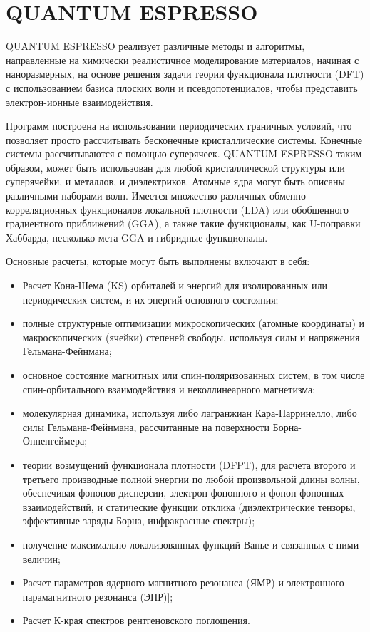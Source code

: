 \section{QUANTUM ESPRESSO}
QUANTUM ESPRESSO реализует различные методы и алгоритмы, направленные на химически реалистичное моделирование материалов, начиная с наноразмерных, на основе решения задачи теории функционала плотности (DFT) с использованием базиса плоских волн и псевдопотенциалов, чтобы представить электрон-ионные взаимодействия.

Программ построена на использовании периодических граничных условий, что позволяет просто рассчитывать бесконечные кристаллические системы. Конечные системы рассчитываются с помощью суперячеек. QUANTUM ESPRESSO таким образом, может быть использован для любой кристаллической структуры или суперячейки, и металлов, и диэлектриков. Атомные ядра могут быть описаны различными наборами волн. Имеется множество различных обменно-корреляционных функционалов локальной плотности (LDA) или обобщенного градиентного приближений (GGA), а также такие функционалы, как U-поправки Хаббарда, несколько мета-GGA и гибридные функционалы.

Основные расчеты, которые могут быть выполнены включают в себя:
\begin{itemize}
    \item Расчет Кона-Шема (KS) орбиталей и энергий для изолированных или периодических систем, и их энергий основного состояния;
    \item полные структурные оптимизации микроскопических (атомные координаты) и макроскопических (ячейки) степеней свободы, используя силы и напряжения Гельмана-Фейнмана;
    \item основное состояние магнитных или спин-поляризованных систем, в том числе спин-орбитального взаимодействия и неколлинеарного магнетизма;
    \item молекулярная динамика, используя либо лагранжиан Кара-Парринелло, либо силы Гельмана-Фейнмана, рассчитанные на поверхности Борна-Оппенгеймера;
    \item теории возмущений функционала плотности (DFPT), для расчета второго и третьего производные полной энергии по любой произвольной длины волны, обеспечивая фононов дисперсии, электрон-фононного и фонон-фононных взаимодействий, и статические функции отклика (диэлектрические тензоры, эффективные заряды Борна, инфракрасные спектры);
    \item получение максимально локализованных функций Ванье  и связанных с ними величин;
    \item Расчет параметров ядерного магнитного резонанса (ЯМР) и электронного парамагнитного резонанса (ЭПР)];
    \item Расчет К-края спектров рентгеновского поглощения.
\end{itemize}
